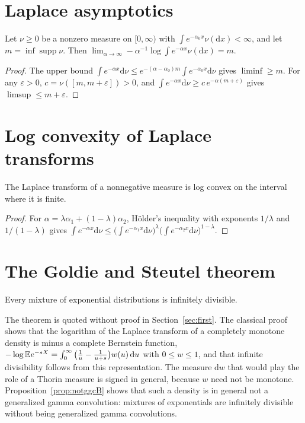 \section{Laplace asymptotics}

\begin{proposition}
Let $\nu\ge0$ be a nonzero measure on $[0,\infty)$ with $\int e^{-\alpha_0x}\nu(\mathrm dx)<\infty$, and let $m=\inf\operatorname{supp}\nu$. Then $\lim_{\alpha\to\infty}-\alpha^{-1}\log\int e^{-\alpha x}\nu(\mathrm dx)=m$.
\end{proposition}

\begin{proof}
The upper bound $\int e^{-\alpha x}\mathrm d\nu\le e^{-(\alpha-\alpha_0)m}\int e^{-\alpha_0x}\mathrm d\nu$ gives $\liminf\ge m$. For any $\varepsilon>0$, $c=\nu([m,m+\varepsilon])>0$, and $\int e^{-\alpha x}\mathrm d\nu\ge c\,e^{-\alpha(m+\varepsilon)}$ gives $\limsup\le m+\varepsilon$.
\end{proof}

\section{Log convexity of Laplace transforms}

\begin{proposition}
The Laplace transform of a nonnegative measure is log convex on the interval where it is finite.
\end{proposition}

\begin{proof}
For $\alpha=\lambda\alpha_1+(1-\lambda)\alpha_2$, H\"older's inequality with exponents $1/\lambda$ and $1/(1-\lambda)$ gives $\int e^{-\alpha x}\mathrm d\nu\le\big(\int e^{-\alpha_1x}\mathrm d\nu\big)^\lambda\big(\int e^{-\alpha_2x}\mathrm d\nu\big)^{1-\lambda}$.
\end{proof}

\section{The Goldie and Steutel theorem}

\begin{theorem}
Every mixture of exponential distributions is infinitely divisible.
\end{theorem}

The theorem is quoted without proof in Section~\ref{sec:first}. The classical proof shows that the logarithm of the Laplace transform of a completely monotone density is minus a complete Bernstein function, $-\log\mathbb{E} e^{-sX}=\int_0^\infty\big(\frac1u-\frac1{u+s}\big)w(u)\,\mathrm du$ with $0\le w\le1$, and that infinite divisibility follows from this representation. The measure $\mathrm dw$ that would play the role of a Thorin measure is signed in general, because $w$ need not be monotone. Proposition~\ref{prop:notggcB} shows that such a density is in general not a generalized gamma convolution: mixtures of exponentials are infinitely divisible without being generalized gamma convolutions.

